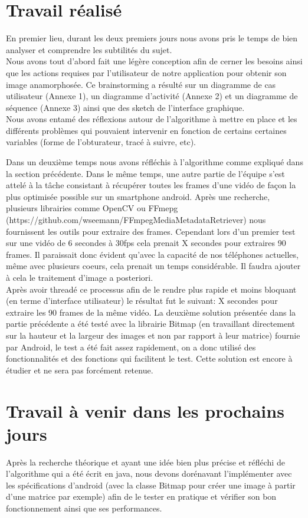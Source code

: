 \documentclass[a4paper,12pt]{report}
\begin{document}
\chapter{Travail réalisé}
En premier lieu, durant les deux premiers jours nous avons pris le temps de bien analyser et comprendre les subtilités du sujet. 
\\Nous avons tout d’abord fait une légère conception afin de cerner les besoins ainsi que les actions requises par l’utilisateur de notre application pour obtenir son image anamorphosée.
Ce brainstorming a résulté sur un diagramme de cas utilisateur (Annexe 1), un diagramme d’activité (Annexe 2) et un diagramme de séquence (Annexe 3) ainsi que des sketch de l’interface graphique.
\\Nous avons entamé des réflexions autour de l’algorithme à mettre en place et les différents problèmes qui pouvaient intervenir en fonction de certains certaines variables (forme de l’obturateur, tracé à suivre, etc).\bigskip

Dans un deuxième temps nous avons réfléchis à l’algorithme comme expliqué dans la section précédente.
Dans le même temps, une autre partie de l’équipe s’est attelé à la tâche consistant à récupérer toutes les frames d’une vidéo de façon la plus optimisée possible sur un smartphone android.
Après une recherche, plusieurs librairies comme OpenCV ou FFmepg  (https://github.com/wseemann/FFmpegMediaMetadataRetriever) nous fournissent les outils pour extraire des frames.
Cependant lors d’un premier test sur une vidéo de 6 secondes à 30fps cela prenait X secondes pour extraires 90 frames.
Il paraissait donc évident qu’avec la capacité de nos téléphones actuelles, même avec plusieurs coeurs, cela prenait un temps considérable.
Il faudra ajouter à cela le traitement d’image a posteriori.
\\Après avoir threadé ce processus afin de le rendre plus rapide et moins bloquant (en terme d’interface utilisateur) le résultat fut le suivant: X secondes pour extraire les 90 frames de la même vidéo.
\newpage
La deuxième solution présentée dans la partie précédente a été testé avec la librairie Bitmap (en travaillant directement sur la hauteur et la largeur des images et non par rapport à leur matrice) fournie par Android,
le test a été fait assez rapidement, on a donc utilisé des fonctionnalités et des fonctions qui facilitent le test.
Cette solution est encore à étudier et ne sera pas forcément retenue.

\chapter{Travail à venir dans les prochains jours}
Après la recherche théorique et ayant une idée bien plus précise et réfléchi de l’algorithme qui a été écrit en java, nous devons dorénavant l’implémenter avec
les spécifications d’android (avec la classe Bitmap pour créer une image à partir d’une matrice par exemple) afin de le tester en pratique et vérifier son bon fonctionnement ainsi que ses performances.
\end{document}
